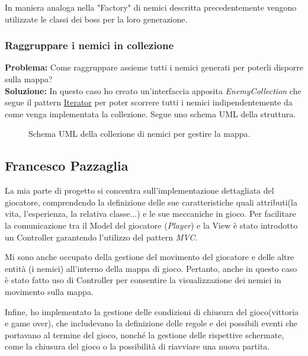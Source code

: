 \documentclass[a4paper,12pt]{report}
\begin{document}
In maniera analoga nella "Factory" di nemici descritta precedentemente vengono utilizzate le classi dei boss per la loro generazione.

\subsubsection{Raggruppare i nemici in collezione}
\textbf{Problema:} Come raggruppare assieme tutti i nemici generati per poterli disporre sulla mappa?\\
\textbf{Soluzione:} In questo caso ho creato un'interfaccia apposita \textit{EnemyCollection} che segue il pattern \href{https://refactoring.guru/design-patterns/iterator}{Iterator} per poter scorrere tutti i nemici indipendentemente da come venga implementata la collezione. Segue uno schema UML della struttura.

\begin{figure}[H]
	\centering
	
	\caption{Schema UML della collezione di nemici per gestire la mappa.}
	\label{fig:Schema UML della collezione di nemici per gestire la mappa.}
\end{figure}

\subsection*{Francesco Pazzaglia}
La mia parte di progetto si concentra sull'implementazione dettagliata del giocatore, comprendendo la definizione delle sue caratteristiche quali attributi(la vita, l'esperienza, la relativa classe...) e le sue meccaniche in gioco. Per facilitare la comunicazione tra il Model del giocatore (\textit{Player}) e la View è stato introdotto un Controller garantendo l'utilizzo del pattern \textit{MVC}.

Mi sono anche occupato della gestione del movimento del giocatore e delle altre entità (i nemici) all'interno della mappa di gioco. Pertanto, anche in questo caso è stato fatto uso di Controller per consentire la visualizzazione dei nemici in movimento sulla mappa.

Infine, ho implementato la gestione delle condizioni di chiusura del gioco(vittoria e game over), che includevano la definizione delle regole e dei possibili eventi che portavano al termine del gioco, nonché la gestione delle rispettive schermate, come la chiusura del gioco o la possibilità di riavviare una nuova partita.
\end{document}

